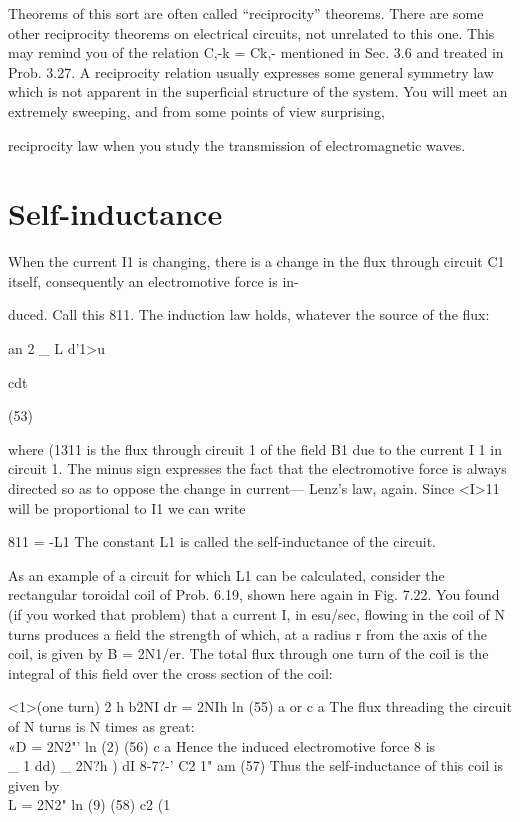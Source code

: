 Theorems of this sort are often called ``reciprocity'' theorems.
There are some other reciprocity theorems on electrical circuits, not
unrelated to this one. This may remind you of the relation C,-k = Ck,-
mentioned in Sec. 3.6 and treated in Prob. 3.27. A reciprocity relation
usually expresses some general symmetry law which is not apparent
in the superficial structure of the system. You will meet an
extremely sweeping, and from some points of view surprising,

reciprocity law when you study the transmission of electromagnetic
waves.

\section{Self-inductance}
When the current I1 is changing, there is a change in the flux
through circuit C1 itself, consequently an electromotive force is in-

duced. Call this 811. The induction law holds, whatever the source
of the flux:

\begin{equation}
\end{equation}
an 2 _ L d'1>u

cdt

(53)

where (1311 is the flux through circuit 1 of the field B1 due to the current
I 1 in circuit 1. The minus sign expresses the fact that the electromotive
force is always directed so as to oppose the change in current---
Lenz's law, again. Since <I>11 will be proportional to I1 we can write

\begin{equation}
\end{equation}
811 = -L1 %
The constant L1 is called the self-inductance of the circuit.

As an example of a circuit for which L1 can be calculated, consider
the rectangular toroidal coil of Prob. 6.19, shown here again in
Fig. 7.22. You found (if you worked that problem) that a current I,
in esu/sec, flowing in the coil of N turns produces a field the strength
of which, at a radius r from the axis of the coil, is given by B = 2N1/er.
The total flux through one turn of the coil is the integral of this field
over the cross section of the coil:

\begin{equation}
\end{equation}
<1>(one turn) 2 h b2NI dr = 2NIh ln  (55)
a or c a
The flux threading the circuit of N turns is N times as great:
\begin{equation}
\end{equation}
«D = 2N2"' ln (2) (56)
c a
Hence the induced electromotive force 8 is
\begin{equation}
\end{equation}
_ 1 dd) _ 2N?h ) dI
8-7?-' C2 1" am (57)
Thus the self-inductance of this coil is given by
\begin{equation}
\end{equation}
L = 2N2" ln (9) (58)
c2 (1

